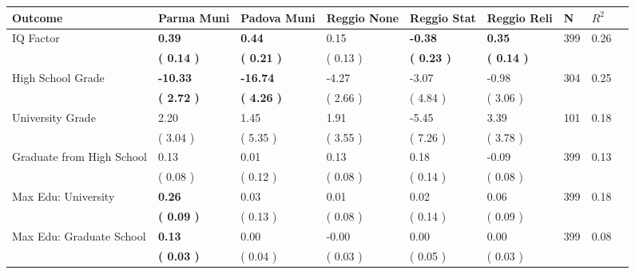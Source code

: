 \begin{tabular}{L{6.2cm} C{1.8cm} C{1.8cm} C{1.8cm} C{1.8cm} C{1.8cm} C{1.8cm} C{0.3cm} C{0.3cm}}
\toprule
 \textbf{Outcome} & \textbf{Parma Muni} & \textbf{Padova Muni} & \textbf{Reggio None} & \textbf{Reggio Stat} & \textbf{Reggio Reli} & \textbf{N} & \textbf{$ R^2$} \\
\midrule
IQ Factor & \textbf{     0.39} & \textbf{     0.44} &      0.15 & \textbf{    -0.38} & \textbf{     0.35}  & 399 &       0.26 \\ 
 & \textbf{(     0.14 )} & \textbf{(     0.21 )} & (     0.13 ) & \textbf{(     0.23 )} & \textbf{(     0.14 )}  & \\
High School Grade & \textbf{   -10.33} & \textbf{   -16.74} &     -4.27 &     -3.07 &     -0.98  & 304 &       0.25 \\ 
 & \textbf{(     2.72 )} & \textbf{(     4.26 )} & (     2.66 ) & (     4.84 ) & (     3.06 )  & \\
University Grade &      2.20 &      1.45 &      1.91 &     -5.45 &      3.39  & 101 &       0.18 \\ 
 & (     3.04 ) & (     5.35 ) & (     3.55 ) & (     7.26 ) & (     3.78 )  & \\
Graduate from High School &      0.13 &      0.01 &      0.13 &      0.18 &     -0.09  & 399 &       0.13 \\ 
 & (     0.08 ) & (     0.12 ) & (     0.08 ) & (     0.14 ) & (     0.08 )  & \\
Max Edu: University & \textbf{     0.26} &      0.03 &      0.01 &      0.02 &      0.06  & 399 &       0.18 \\ 
 & \textbf{(     0.09 )} & (     0.13 ) & (     0.08 ) & (     0.14 ) & (     0.09 )  & \\
Max Edu: Graduate School & \textbf{     0.13} &      0.00 &     -0.00 &      0.00 &      0.00  & 399 &       0.08 \\ 
 & \textbf{(     0.03 )} & (     0.04 ) & (     0.03 ) & (     0.05 ) & (     0.03 )  & \\
\bottomrule
\end{tabular}
